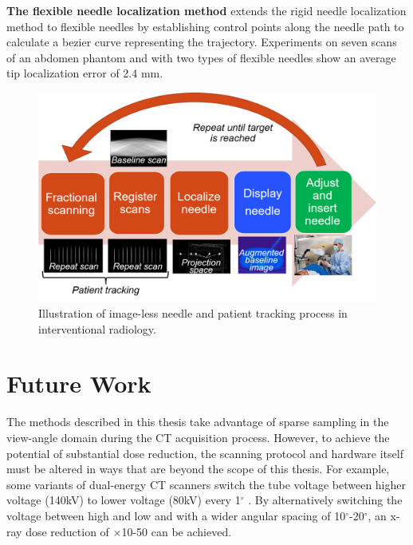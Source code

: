 \textbf{The flexible needle localization method} extends the rigid needle localization method to flexible needles by establishing control points along the needle path to calculate a bezier curve representing the trajectory. Experiments on seven scans of an abdomen phantom and with two types of flexible needles show an average tip localization error of 2.4 mm.

\begin{figure}
    \centering
    \includegraphics[width=15cm]{figures/needle+patient_tracking.png}
    \caption{\small{Illustration of image-less needle and patient tracking process in interventional radiology.}
}
    \label{fig:figures/needle+patient_tracking.png}
\end{figure}

\section{Future Work}

The methods described in this thesis take advantage of sparse sampling in the view-angle domain during the CT acquisition process. However, to achieve the potential of substantial dose reduction, the scanning protocol and hardware itself must be altered in ways that are beyond the scope of this thesis. For example, some variants of dual-energy CT scanners switch the tube voltage between higher voltage (140kV) to lower voltage (80kV) every 1$^\circ$ 
\cite{goo2017dual}. By alternatively switching the voltage between high and low and with a wider angular spacing of 10$^\circ$-20$^\circ$, an x-ray dose reduction of $\times$10-50 can be achieved.

